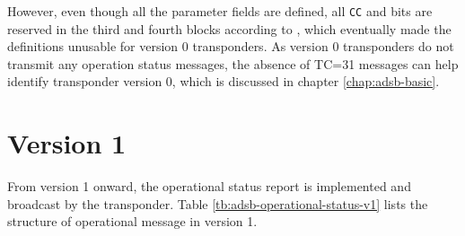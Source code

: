 However, even though all the parameter fields are defined, all 
\texttt{CC} and  bits are reserved in the third and fourth blocks according to \cite{icao9871v1}, which eventually made the definitions unusable for version 0 transponders. As version 0 transponders do not transmit any operation status messages, the absence of TC=31 messages can help identify transponder version 0, which is discussed in chapter \ref{chap:adsb-basic}.

\section{Version 1}

From version 1 onward, the operational status report is implemented and broadcast by the transponder. Table \ref{tb:adsb-operational-status-v1} lists the structure of operational message in version 1.


